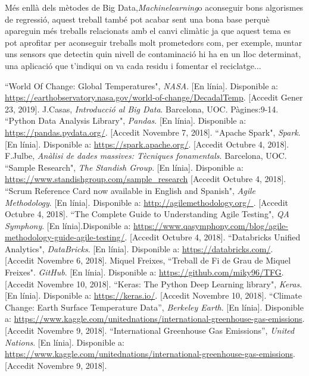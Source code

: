 \documentclass[10pt,a4paper,twocolumn,twoside]{article}
\begin{document}
Més enllà dels mètodes de Big Data,\textit{Machinelearning}o aconseguir bons algorismes de regressió, aquest treball també pot acabar sent una bona base perquè apareguin més treballs relacionats amb el canvi climàtic ja que aquest tema es pot aprofitar per aconseguir treballs molt prometedors com, per exemple, muntar uns sensors que detectin quin nivell de contaminació hi ha en un lloc determinat, una aplicació que t'indiqui on va cada residu i fomentar el reciclatge...

\begin{thebibliography}{11}
``World Of Change: Global Temperatures", \textit{NASA}. [En línia]. Disponible a: \url{https://earthobservatory.nasa.gov/world-of-change/DecadalTemp}. [Accedit Gener 23, 2019].
J.Casas, \textit{Introducció al Big Data}. Barcelona, UOC. Pàgines:9-14.
 ``Python Data Analysis Library", \textit{Pandas}. [En línia]. Disponible a: \url{https://pandas.pydata.org/}. [Accedit Novembre 7, 2018].
``Apache Spark", \textit{Spark}. [En línia]. Disponible a: \url{https://spark.apache.org/}. [Accedit Octubre 4, 2018].
F.Julbe, \textit{Anàlisi de dades massives: Tècniques fonamentals}. Barcelona, UOC.
``Sample Research", \textit{The Standish Group}. [En línia]. Disponible a: \url{https://www.standishgroup.com/sample_research} [Accedit Octubre 4, 2018].
``Scrum Reference Card now available in English and Spanish",  \textit{Agile Methodology}. [En línia]. Disponible a: \url{http://agilemethodology.org/ }. [Accedit Octubre 4, 2018].
``The Complete Guide to Understanding Agile Testing", \textit{QA Symphony}. [En línia].Disponible a: \url{https://www.qasymphony.com/blog/agile-methodology-guide-agile-testing/}. [Accedit Octubre 4, 2018].
``Databricks Unified Analytics", \textit{DataBricks}. [En línia]. Disponible a: \url{https://databricks.com/}. [Accedit Novembre 6, 2018].
Miquel Freixes, ``Treball de Fi de Grau de Miquel Freixes". \textit{GitHub}. [En línia]. Disponible a: \url{ https://github.com/miky96/TFG}. [Accedit Novembre 10, 2018].
``Keras: The Python Deep Learning library", \textit{Keras}. [En línia]. Disponible a: \url{https://keras.io/}. [Accedit Novembre 10, 2018].
``Climate Change: Earth Surface Temperature Data”, \textit{Berkeley Earth}. [En línia]. Disponible a: \url{ https://www.kaggle.com/unitednations/international-greenhouse-gas-emissions}. [Accedit Novembre 9, 2018].
 ``International Greenhouse Gas Emissions”, \textit{United Nations}. [En línia]. Disponible a: \url{ https://www.kaggle.com/unitednations/international-greenhouse-gas-emissions}. [Accedit Novembre 9, 2018].

\end{thebibliography}
\end{document}
